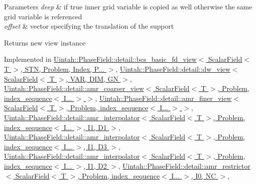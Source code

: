 \begin{DoxyParams}{Parameters}
{\em deep} & if true inner grid variable is copied as well otherwise the same grid variable is referenced \\
\hline
{\em offset} & vector specifying the translation of the support \\
\hline
\end{DoxyParams}
\begin{DoxyReturn}{Returns}
new view instance 
\end{DoxyReturn}


Implemented in \hyperlink{classUintah_1_1PhaseField_1_1detail_1_1bcs__basic__fd__view_3_01ScalarField_3_01T_01_4_00_01STN_07caa9955adf783da0505eac75e76f08_abc781c41321336b5cc9e47157d133b2e}{Uintah\+::\+Phase\+Field\+::detail\+::bcs\+\_\+basic\+\_\+fd\+\_\+view$<$ Scalar\+Field$<$ T $>$, S\+T\+N, Problem, Index, P... $>$}, \hyperlink{classUintah_1_1PhaseField_1_1detail_1_1dw__view_3_01ScalarField_3_01T_01_4_00_01VAR_00_01DIM_00_01GN_01_4_a47a3e1a15a57b331281c3c374e49bdc8}{Uintah\+::\+Phase\+Field\+::detail\+::dw\+\_\+view$<$ Scalar\+Field$<$ T $>$, V\+A\+R, D\+I\+M, G\+N $>$}, \hyperlink{classUintah_1_1PhaseField_1_1detail_1_1amr__coarser__view_3_01ScalarField_3_01T_01_4_00_01Proble9cadea116dab5bdb44bb3e29abbe99ef_ac4654e84d3f8f4498e45eddfe0818370}{Uintah\+::\+Phase\+Field\+::detail\+::amr\+\_\+coarser\+\_\+view$<$ Scalar\+Field$<$ T $>$, Problem, index\+\_\+sequence$<$ I... $>$ $>$}, \hyperlink{classUintah_1_1PhaseField_1_1detail_1_1amr__finer__view_3_01ScalarField_3_01T_01_4_00_01Problem_810ae3f886a4d3bdb2b37c629369a2ec_afae4d2b27a016b9f84d795d3e698608f}{Uintah\+::\+Phase\+Field\+::detail\+::amr\+\_\+finer\+\_\+view$<$ Scalar\+Field$<$ T $>$, Problem, index\+\_\+sequence$<$ I... $>$ $>$}, \hyperlink{classUintah_1_1PhaseField_1_1detail_1_1amr__interpolator_3_01ScalarField_3_01T_01_4_00_01Problem71844444bc14a03c0566689b6b502040_a52720f26bf906c6bd380490b4579ffa0}{Uintah\+::\+Phase\+Field\+::detail\+::amr\+\_\+interpolator$<$ Scalar\+Field$<$ T $>$, Problem, index\+\_\+sequence$<$ I... $>$, I1, D1 $>$}, \hyperlink{classUintah_1_1PhaseField_1_1detail_1_1amr__interpolator_3_01ScalarField_3_01T_01_4_00_01Problemdf68628a6010a1e1526666730125c372_ac7391fa05270a0b845674752ce8bb8bf}{Uintah\+::\+Phase\+Field\+::detail\+::amr\+\_\+interpolator$<$ Scalar\+Field$<$ T $>$, Problem, index\+\_\+sequence$<$ I... $>$, I1, D3 $>$}, \hyperlink{classUintah_1_1PhaseField_1_1detail_1_1amr__interpolator_3_01ScalarField_3_01T_01_4_00_01Problemd2db9de1754b5450c93c191a9275f5ed_a62362155afcaf1db632655a3a8ab23f4}{Uintah\+::\+Phase\+Field\+::detail\+::amr\+\_\+interpolator$<$ Scalar\+Field$<$ T $>$, Problem, index\+\_\+sequence$<$ I... $>$, I1, D2 $>$}, \hyperlink{classUintah_1_1PhaseField_1_1detail_1_1amr__restrictor_3_01ScalarField_3_01T_01_4_00_01Problem_05760ee5d1d3adcc969b3f56f71e72acb_a81b7ca467a9a0f54f9bf37ca18038240}{Uintah\+::\+Phase\+Field\+::detail\+::amr\+\_\+restrictor$<$ Scalar\+Field$<$ T $>$, Problem, index\+\_\+sequence$<$ I... $>$, I0, N\+C $>$}, 